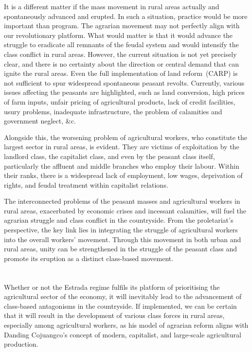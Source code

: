 It is a different matter if the mass movement in rural areas 
actually and spontaneously advanced and erupted. 
In such a situation, practice would be more important than program. 
The agrarian movement may not perfectly align with our revolutionary platform. 
What would matter is that it would advance the struggle to eradicate all remnants
of the feudal system and would intensify the class conflict in rural areas. 
However, the current situation is not yet precisely clear,
and there is no certainty about the direction or central demand 
that can ignite the rural areas. 
Even the full implementation of land reform~(CARP) is not sufficient to spur 
widespread spontaneous peasant revolts. 
Currently, various issues affecting the peasants are highlighted, 
such as land conversion, high prices of farm inputs, 
unfair pricing of agricultural products, lack of credit facilities, 
usury problems, inadequate infrastructure, 
the problem of calamities and government neglect, \&c.

Alongside this, the worsening problem of agricultural workers, 
who constitute the largest sector in rural areas, is evident. 
They are victims of exploitation by the landlord class, the capitalist class, 
and even by the peasant class itself, particularly the affluent and 
middle branches who employ their labour. 
Within their ranks, there is a widespread lack of employment, low wages, 
deprivation of rights, and feudal treatment within capitalist relations.

The interconnected problems of the peasant masses and agricultural workers 
in rural areas, exacerbated by economic crises and incessant calamities,
will fuel the agrarian struggle and class conflict in the countryside. 
From the proletariat's perspective, the key link lies in integrating 
the struggle of agricultural workers into the overall workers' movement. 
Through this movement in both urban and rural areas, unity can be strengthened 
in the struggle of the peasant class and promote its eruption as a distinct 
class-based movement.


\section{}
Whether or not the Estrada regime fulfils its platform of prioritising 
the agricultural sector of the economy, it will inevitably lead to the 
advancement of class-based antagonisms in the countryside. 
If implemented, we can be certain that it will result in the development of 
various class forces in rural areas, especially among agricultural workers, 
as his model of agrarian reform aligns with Danding Cojuangco's concept of 
modern, capitalist, and large-scale agricultural production.

